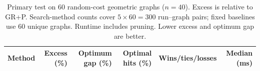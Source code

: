 \begin{table}[t]
\centering\small
\caption{Primary test on 60 random-cost geometric graphs ($n=40$).
Excess is relative to GR+P. Search-method counts cover $5\times60=300$
run--graph pairs; fixed baselines use 60 unique graphs. Runtime includes
pruning. Lower excess and optimum gap are better.}
\label{tab:primary}
\begin{tabular*}{\textwidth}{@{\extracolsep{\fill}}lrrrrr@{}}
\toprule
Method & Excess (\%) & Optimum gap (\%) & Optimal hits (\%) &
Wins/ties/losses & Median (ms)\\
\midrule

\end{tabular*}
\end{table}
